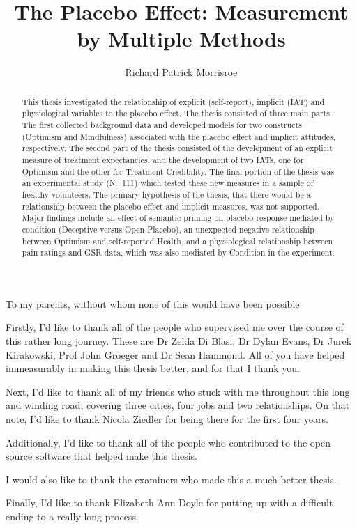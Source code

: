 \documentclass[apsych,phd]{uccthesis}
\title{The Placebo Effect: Measurement by Multiple Methods}
\author[99473437]{Richard Patrick Morrisroe}
\begin{document}


\maketitle





\begin{dedication}
To my parents, without whom none of this would have been possible
\end{dedication}

\begin{abstract}
  This thesis investigated the relationship of explicit (self-report), implicit (IAT) and physiological variables to the placebo effect. The thesis consisted of three main parts. The first collected background data and developed models for two constructs (Optimism and Mindfulness) associated with the placebo effect and implicit attitudes, respectively. The second part of the thesis consisted of the development of an explicit measure of treatment expectancies, and the development of two IATs, one for Optimism and the other for Treatment Credibility. The final portion of the thesis was an experimental study (N=111) which tested these new measures in a sample of healthy volunteers. The primary hypothesis of the thesis, that there would be a relationship between the placebo effect and implicit measures, was not supported. Major findings include an effect of semantic priming on placebo response mediated by condition (Deceptive versus Open Placebo), an unexpected negative relationship between Optimism and self-reported Health, and a physiological relationship between pain ratings and GSR data, which was also mediated by Condition in the experiment. 
\end{abstract}

\begin{acknowledgements}
  Firstly, I'd like to thank all of the people who supervised me over the course of this rather long journey. These are Dr Zelda Di Blasi, Dr Dylan Evans, Dr Jurek Kirakowski, Prof John Groeger and Dr Sean Hammond. All of you have helped immeasurably in making this thesis better, and for that I thank you. 

Next, I'd like to thank all of my friends who stuck with me throughout this long and winding road, covering three cities, four jobs and two relationships. On that note, I'd like to thank Nicola Ziedler for being there for the first four years. 

Additionally, I'd like to thank all of the people who contributed to the open source software that helped make this thesis. 

I would also like to thank the examiners who made this a much better thesis. 

Finally, I'd like to thank Elizabeth Ann Doyle for putting up with a difficult ending to a really long process. 
\end{acknowledgements}
\end{document}
